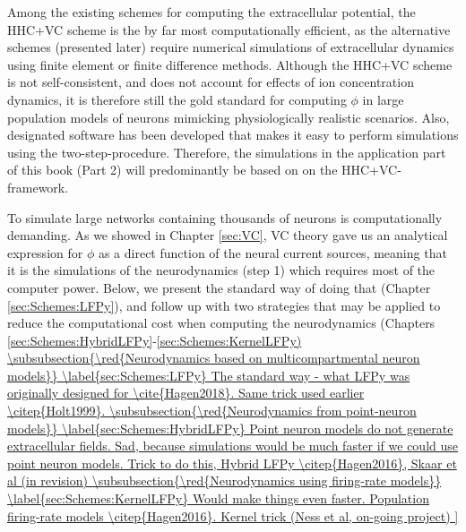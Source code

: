 Among the existing schemes for computing the extracellular potential, the HHC+VC scheme is the by far most computationally efficient, as the alternative schemes (presented later) require numerical simulations of extracellular dynamics using finite element or finite difference methods. Although the HHC+VC scheme is not self-consistent, and does not account for effects of ion concentration dynamics, it is therefore still the gold standard for computing $\phi$ in large population models of neurons mimicking physiologically realistic scenarios. Also, designated software has been developed that makes it easy to perform simulations using the two-step-procedure. Therefore, the simulations in the application part of this book (Part 2) will predominantly be based on on the HHC+VC-framework.

To simulate large networks containing thousands of neurons is computationally demanding. As we showed in Chapter \ref{sec:VC}, VC theory gave us an analytical expression for $\phi$ as a direct function of the neural current sources, meaning that it is the simulations of the neurodynamics (step 1) which requires most of the computer power. Below, we present the standard way of doing that (Chapter \ref{sec:Schemes:LFPy}), and follow up with two strategies that may be applied to reduce the computational cost when computing the neurodynamics (Chapters \ref{sec:Schemes:HybridLFPy}-\ref{sec:Schemes:KernelLFPy)

\subsubsection{\red{Neurodynamics based on multicompartmental neuron models}}
\label{sec:Schemes:LFPy}
The standard way - what LFPy was originally designed for \cite{Hagen2018}.
Same trick used earlier \citep{Holt1999}.


\subsubsection{\red{Neurodynamics from point-neuron models}}
\label{sec:Schemes:HybridLFPy}

Point neuron models do not generate extracellular fields. Sad, because simulations would be much faster if we could use point 
neuron models. Trick to do this, Hybrid LFPy \citep{Hagen2016}, Skaar et al (in revision)


\subsubsection{\red{Neurodynamics using firing-rate models}}
\label{sec:Schemes:KernelLFPy}
Would make things even faster. Population firing-rate models  \citep{Hagen2016}. Kernel trick (Ness et al, on-going project) 


}
